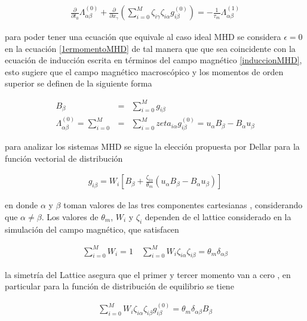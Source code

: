 \begin{eqnarray}
    \frac{\partial}{\partial t_{0}}\Lambda_{\alpha\beta}^{(0)}+\frac{\partial}{\partial x_{\gamma}}\left(\sum_{i=0}^{M}\zeta_{i\gamma}\zeta_{i\alpha}g_{i\beta}^{(0)}\right) = -\frac{1}{\tau_{m}}\Lambda_{\alpha\beta}^{(1)}
\end{eqnarray}

\noindent para poder tener una ecuación que equivale al caso ideal MHD se considera $\epsilon = 0$ en la ecuación \eqref{1ermomentoMHD} de tal manera que que sea coincidente con la ecuación de inducción escrita en términos del campo magnético \eqref{induccionMHD}, esto sugiere que el campo magnético macroscópico y los momentos de orden superior se definen de la siguiente forma

\begin{eqnarray}
    B_{\beta} &=& \sum_{i=0}^{M}g_{i\beta}\\
    \Lambda_{\alpha\beta}^{(0)} = \sum_{i=0}^{M}&=&\sum_{i=0}^{M}zeta_{i\alpha}g_{i\beta}^{(0)}=u_{\alpha}B_{\beta}-B_{\alpha}u_{\beta}
\end{eqnarray}

\noindent para analizar los sistemas MHD se sigue la elección propuesta por Dellar\cite{Dellar} para la función vectorial de distribución

\begin{eqnarray}
    g_{i\beta} = W_{i}\left[B_{\beta}+\frac{\zeta_{i\alpha}}{\theta_{m}}(u_{\alpha}B_{\beta}-B_{\alpha}u_{\beta})\right]
\end{eqnarray}

\noindent en donde $\alpha$ y $\beta$ toman valores de las tres componentes cartesianas , considerando que $\alpha\neq\beta$. Los valores de $\theta_{m}$, $W_{i}$ y $\zeta_{i}$ dependen de el lattice considerado en la simulación del campo magnético, que satisfacen 

\begin{eqnarray}
    \sum_{i=0}^{M}W_{i}=1 \quad \sum_{i=0}^{M}W_{i}\zeta_{i\alpha}\zeta_{i\beta}=\theta_{m}\delta_{\alpha\beta}
\end{eqnarray}

\noindent la simetría del Lattice asegura que el primer y tercer momento van a cero , en particular para la función de distribución de equilibrio se tiene 

\begin{eqnarray}
    \sum_{i=0}^{M}W_{i}\zeta_{i\alpha}\zeta_{i\beta}g_{i\beta}^{(0)}=\theta_{m}\delta_{\alpha\beta}B_{\beta}
\end{eqnarray}

